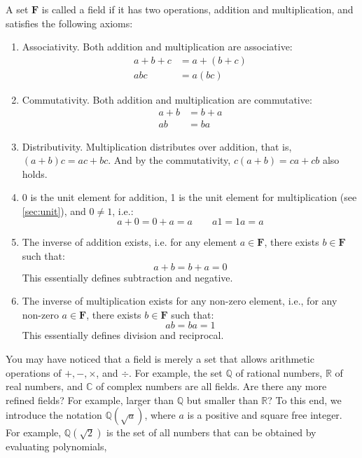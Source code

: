 \begin{definition}
A set $\mathbf{F}$ is called a field if it has two operations, addition and multiplication, and satisfies the following axioms:
\begin{enumerate}[(1)]
\item Associativity. Both addition and multiplication are associative:
  \begin{align*}
    a + b + c &= a + (b + c) \\
    abc &= a(bc)
  \end{align*}

\item Commutativity. Both addition and multiplication are commutative:
  \begin{align*}
    a + b &= b + a \\
    ab &= ba
  \end{align*}

\item Distributivity. Multiplication distributes over addition, that is, $(a + b)c = ac + bc$. And by the commutativity, $c(a + b) = ca + cb$ also holds.
\item 0 is the unit element for addition, 1 is the unit element for multiplication (see \cref{sec:unit}), and $0 \ne 1$, i.e.:
\[
a + 0 = 0 + a = a \qquad a1 = 1a = a
\]

\item The inverse of addition exists, i.e. for any element $a \in \mathbf{F}$, there exists $b \in \mathbf{F}$ such that:
\[
a + b = b + a = 0
\]
This essentially defines subtraction and negative.

\item The inverse of multiplication exists for any non-zero element, i.e., for any non-zero $a \in \mathbf{F}$, there exists $b \in \mathbf{F}$ such that:
\[
ab = ba = 1
\]
This essentially defines division and reciprocal.
\end{enumerate}
\end{definition}

You may have noticed that a field is merely a set that allows arithmetic operations of $+, -, \times$, and $\div$. For example, the set $\mathbb{Q}$ of rational numbers, $\mathbb{R}$ of real numbers, and $\mathbb{C}$ of complex numbers are all fields. Are there any more refined fields? For example, larger than $\mathbb{Q}$ but smaller than $\mathbb{R}$? To this end, we introduce the notation $\mathbb{Q}(\sqrt{a})$, where $a$ is a positive and square free integer. For example, $\mathbb{Q}(\sqrt{2})$ is the set of all numbers that can be obtained by evaluating polynomials,

